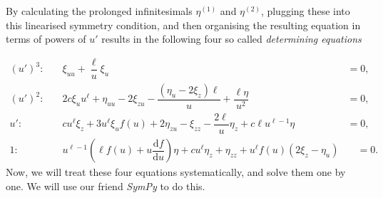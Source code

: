 By calculating the prolonged infinitesimals $\eta^{(1)}$ and $\eta^{(2)}$, plugging these into this linearised symmetry condition, and then organising the resulting equation in terms of powers of $u'$ results in the following four so called \textit{determining equations}

\begin{align}
(u')^3:&\quad\xi_{uu}+\dfrac{\ell}{u}\xi_u&=0,\label{eq:det_eq_1}\\
(u')^2:&\quad2c\xi_u u^{\ell}+\eta_{uu}-2\xi_{zu}-\dfrac{(\eta_u-2\xi_z)\ell}{u}+\dfrac{\ell\eta}{u^2}&=0,\label{eq:det_eq_2}\\
u':&\quad cu^{\ell}\xi_z+3u^{\ell}\xi_u f(u)+2\eta_{zu}-\xi_{zz}-\dfrac{2\ell}{u}\eta_z+c\ell u^{\ell-1}\eta&=0,\label{det_eq_3}\\
1:&\quad u^{\ell-1}\left(\ell f(u)+u\dfrac{\mathrm{d}f}{\mathrm{d}u}\right)\eta+cu^{\ell}\eta_z+\eta_{zz}+u^{\ell}f(u)(2\xi_z-\eta_u)&\quad=0.\label{det_eq_4}
\end{align}
Now, we will treat these four equations systematically, and solve them one by one. We will use our friend \textit{SymPy} to do this.
